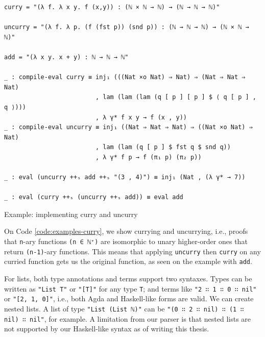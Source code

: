 \begin{listing}[H]
\begin{verbatim}
curry = "(λ f. λ x y. f (x,y)) : (ℕ × ℕ → ℕ) → (ℕ → ℕ → ℕ)"

uncurry = "(λ f. λ p. (f (fst p)) (snd p)) : (ℕ → ℕ → ℕ) → (ℕ × ℕ → ℕ)"

add = "(λ x y. x + y) : ℕ → ℕ → ℕ"

_ : compile-eval curry ≡ inj₁ (((Nat ×o Nat) ⇒ Nat) ⇒ (Nat ⇒ Nat ⇒ Nat)
                         , lam (lam (lam (q [ p ] [ p ] $ ⟨ q [ p ] , q ⟩)))
                         , λ γ* f x y → f (x , y))
_ : compile-eval uncurry ≡ inj₁ ((Nat ⇒ Nat ⇒ Nat) ⇒ ((Nat ×o Nat) ⇒ Nat)
                         , lam (lam (q [ p ] $ fst q $ snd q))
                         , λ γ* f p → f (π₁ p) (π₂ p))

_ : eval (uncurry ++ₛ add ++ₛ "(3 , 4)") ≡ inj₁ (Nat , (λ γ* → 7))

_ : eval (curry ++ₛ (uncurry ++ₛ add)) ≡ eval add
\end{verbatim}
\caption{Example: implementing curry and uncurry}
\label{code:examples-curry}
\end{listing}

On Code \ref{code:examples-curry}, we show currying and uncurrying, i.e., proofs that \verb$n$-ary functions \verb$(n ∈ ℕ⁺)$ are isomorphic to unary higher-order ones that return \verb$(n-1)$-ary functions. This means that applying \verb$uncurry$ then \verb$curry$ on any curried function gets us the original function, as seen on the example with \verb$add$.

For lists, both type annotations and terms support two syntaxes. Types can be written as \verb$"List T"$ or \verb$"[T]"$ for any type \verb$T$; and terms like \verb$"2 ∷ 1 ∷ 0 ∷ nil"$ or \verb$"[2, 1, 0]"$, i.e., both Agda and Haskell-like forms are valid. We can create nested lists. A list of type \verb$"List (List ℕ)"$ can be \verb$"(0 ∷ 2 ∷ nil) ∷ (1 ∷ nil) ∷ nil"$, for example. A limitation from our parser is that nested lists are not supported by our Haskell-like syntax as of writing this thesis.

